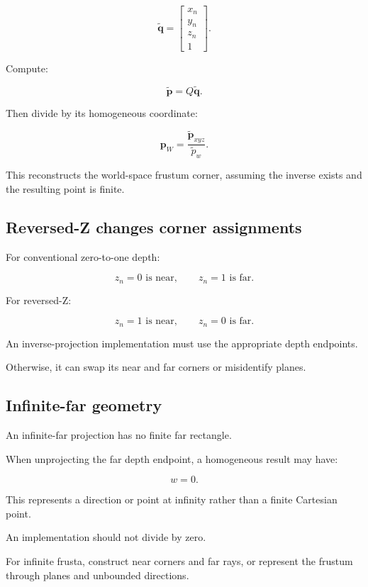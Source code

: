 \[
 \tilde{\mathbf q}= \begin{bmatrix}x_n\\y_n\\z_n\\1\end{bmatrix}.
\]

Compute:

\[
 \tilde{\mathbf p}=Q\tilde{\mathbf q}.
\]

Then divide by its homogeneous coordinate:

\[
 \boxed{ \mathbf p_W= \frac{\tilde{\mathbf p}_{xyz}}{\tilde p_w} }.
\]

This reconstructs the world-space frustum corner, assuming the inverse exists and the resulting point is finite.

\subsection{Reversed-Z changes corner assignments}\label{02-foundations-ii-ch034-reversed-z-changes-corner-assignments}

For conventional zero-to-one depth:

\[
 z_n=0 \text{ is near},\qquad z_n=1 \text{ is far}.
\]

For reversed-Z:

\[
 z_n=1 \text{ is near},\qquad z_n=0 \text{ is far}.
\]

An inverse-projection implementation must use the appropriate depth endpoints.

Otherwise, it can swap its near and far corners or misidentify planes.

\subsection{Infinite-far geometry}\label{02-foundations-ii-ch034-infinite-far-geometry}

An infinite-far projection has no finite far rectangle.

When unprojecting the far depth endpoint, a homogeneous result may have:

\[
 w=0.
\]

This represents a direction or point at infinity rather than a finite Cartesian point.

An implementation should not divide by zero.

For infinite frusta, construct near corners and far rays, or represent the frustum through planes and unbounded directions.

